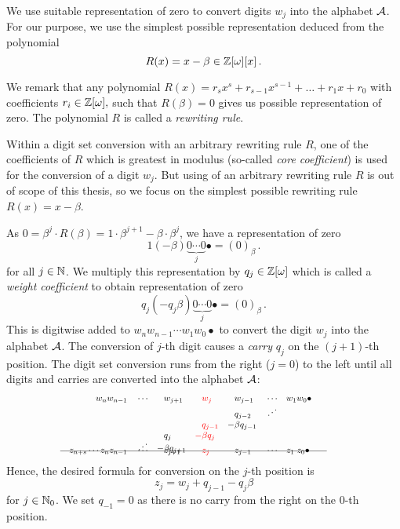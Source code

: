   We use suitable representation of zero to convert digits $w_j$ into the alphabet $\mathcal{A}$. 
  For our purpose, we use the simplest possible representation deduced from the polynomial
  $$
    R(x)=x-\beta \in \mathbb{Z}[\omega][x]\,.
  $$

We remark that any polynomial $R(x)=r_s x^s+r_{s-1}x^{s-1}+ \dots + r_1 x+r_0$ with coefficients $r_i \in \mathbb{Z}[\omega],$ such that $R(\beta)=0$ gives us possible representation of zero. The polynomial $R$ is called a \emph{rewriting rule}. 

Within a digit set conversion with an arbitrary rewriting rule $R$, one of the coefficients of $R$ which is greatest in modulus (so-called \emph{core coefficient}) is used for the conversion of a digit $w_j$. But using of an arbitrary rewriting rule $R$ is out of scope of this thesis, so we focus on the simplest possible rewriting rule $R(x)=x-\beta$.
  
As $0=\beta^{j} \cdot R(\beta)=1\cdot \beta^{j+1} -\beta \cdot \beta^{j}$, we have a representation of zero 
$$1 (-\!\beta) \underbrace{0 \cdots 0}_{j}\bullet = (0)_\beta\,. $$
for all $j \in \mathbb{N}$. We multiply this representation by $q_j \in \mathbb{Z}[\omega]$ which is called a \emph{weight coefficient} to obtain representation of zero 
$$q_j (-q_j\beta) \underbrace{0 \cdots 0}_{j}\bullet = (0)_\beta\,. $$ 
This is digitwise added to $w_{n} w_{n-1}\cdots w_1 w_0 \bullet$ to convert the digit $w_j$ into the alphabet $\mathcal{A}$. The conversion of $j$-th digit causes a \emph{carry} $q_{j}$ on the $(j+1)$-th position. The digit set conversion runs from the right ($j=0$) to the left until all digits and carries are converted into the alphabet $\mathcal{A}$:
        \begin{align}
        \label{eq:conversionScheme}
            \hspace{100pt}  w_n w_{n-1}&&&\cdots& &w_{j+1}&\!\! &\textcolor{red}{w_j}  & \!\!  &w_{j-1} &&\cdots &&w_1 w_0\bullet \hspace{100pt} \notag\\[-5pt]
                         &&&&       &       & &     &   &q_{j-2} &&\iddots  \notag \\[-3pt] 
                         &&&&       &       & &\textcolor{red}{q_{j-1}}& -&\beta q_{j-1} \notag \\[-3pt]
                         &&&&         &q_j&   \textcolor{red}{-}&\textcolor{red}{\beta q_j} &&\\[-8pt]
                         &&&  \iddots      &   -&\beta q_{j+1}&   &\ && \notag \\[-17pt]
          \intertext{\hspace{60pt}\line(1,0){300}}
          \notag \\[-30pt]
           z_{n+s} \cdots z_{n} z_{n-1}&&&\cdots& &z_{j+1}& &\textcolor{red}{z_j}& &z_{j-1} &&\cdots &&z_1 \; z_0\bullet \notag                  
        \end{align}
    Hence, the desired formula for conversion on the $j$-th position is 
    \begin{equation*}
        z_j=w_j + q_{j-1} - q_j \beta
    \end{equation*}
    for $j \in \mathbb{N}_0$. We set $q_{-1}=0$ as there is no carry from the right on the 0-th position.
    
